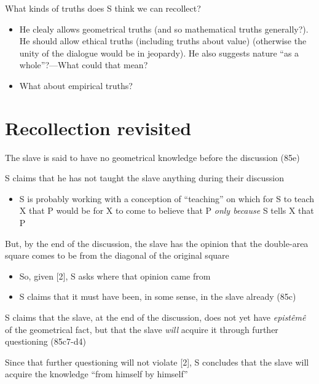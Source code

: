 \documentclass[10 pt]{article}
\begin{document}
 What kinds of truths does S think we can recollect?

\begin{itemize}\item{He clealy allows geometrical truths (and so mathematical truths generally?). He should allow ethical truths (including truths about value) (otherwise the unity of the dialogue would be in jeopardy). He also suggests nature ``as a whole''?---What could that mean?}\item{What about empirical truths?}\end{itemize}

\section*{Recollection revisited}

\noindent [1] The slave is said to have no geometrical knowledge before the discussion (85e)
\vspace*{2mm}

\noindent [2] S claims that he has not taught the slave anything during their discussion
\begin{itemize}\item{S is probably working with a conception of ``teaching'' on which for S to teach X that P would be for X to come to believe that P \emph{only because} S tells X that P}\end{itemize}

\noindent [3] But, by the end of the discussion, the slave has the opinion that the double-area square comes to be from the diagonal of the original square

\begin{itemize}\item{So, given [2], S asks where that opinion came from}\item{S claims that it must have been, in some sense, in the slave already (85c)}\end{itemize}

\noindent [4] S claims that the slave, at the end of the discussion, does not yet have \emph{epist\^{e}m\^{e}} of the geometrical fact, but that the slave \emph{will} acquire it through further questioning (85c7-d4)
\vspace*{2mm}

\noindent [5] Since that further questioning will not violate [2], S concludes that the slave will acquire the knowledge ``from himself by himself''
\vspace*{2mm}
\end{document}
